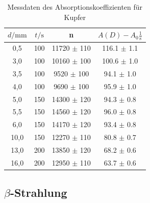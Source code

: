 \begin{table}[H]
    \centering
    \caption{Messdaten des Absorptionskoeffizienten für Kupfer}
    \label{tab:md2kupfer}
    \begin{tabular}{c c c c}
        \toprule
        $d / \unit{\milli\meter}$ &  $t / \unit\second$ &     n & $A(D) - A_0 \frac{1}{\unit\second}$\\
        \midrule
            0,5 &    100 & 11720 $\pm$ 110 & 116.1 $\pm$ 1.1 \\
            3,0 &    100 & 10160 $\pm$ 100 & 100.6 $\pm$ 1.0 \\
            3,5 &    100 &  9520 $\pm$ 100 &  94.1 $\pm$ 1.0 \\
            4,0 &    100 &  9690 $\pm$ 100 &  95.9 $\pm$ 1.0 \\
            5,0 &    150 & 14300 $\pm$ 120 &  94.3 $\pm$ 0.8 \\
            5,5 &    150 & 14560 $\pm$ 120 &  96.0 $\pm$ 0.8 \\
            6,0 &    150 & 14170 $\pm$ 120 &  93.4 $\pm$ 0.8 \\
           10,0 &    150 & 12270 $\pm$ 110 &  80.8 $\pm$ 0.7 \\
           13,0 &    200 & 13850 $\pm$ 120 &  68.2 $\pm$ 0.6 \\
           16,0 &    200 & 12950 $\pm$ 110 &  63.7 $\pm$ 0.6 \\
        \bottomrule
    \end{tabular}
\end{table}


\subsection[Beta-Strahlung]{$\beta$-Strahlung}


